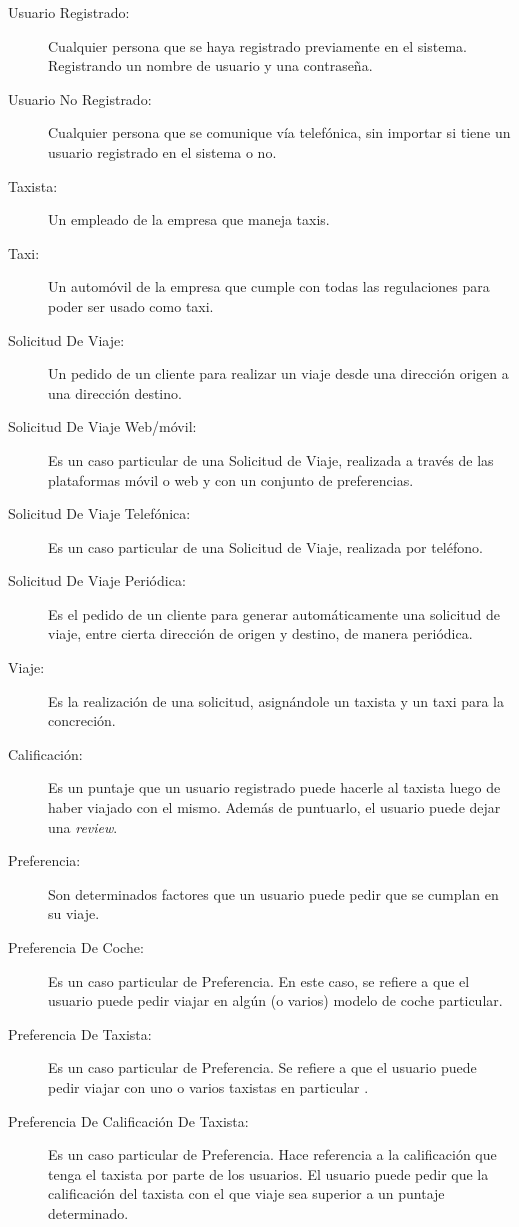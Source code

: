 \documentclass[a4paper, 10pt, twoside]{article}
\begin{document}
\begin{description}
  \item[Usuario Registrado:] Cualquier persona que se haya registrado previamente en el sistema. Registrando un nombre de usuario y una contraseña.

  \item[Usuario No Registrado:] Cualquier persona que se comunique vía telefónica, sin importar si tiene un usuario registrado en el sistema o no.

  \item[Taxista:] Un empleado de la empresa que maneja taxis.

  \item[Taxi:] Un automóvil de la empresa que cumple con todas las regulaciones para poder ser usado como taxi.

  \item[Solicitud De Viaje:] Un pedido de un cliente para realizar un viaje desde una dirección origen a una dirección destino.

  \item[Solicitud De Viaje Web/móvil:] Es un caso particular de una Solicitud de Viaje, realizada a través de las plataformas móvil o web y con un conjunto de preferencias.

  \item[Solicitud De Viaje Telefónica:] Es un caso particular de una Solicitud de Viaje, realizada por teléfono.

  \item[Solicitud De Viaje Periódica:] Es el pedido de un cliente para generar automáticamente una solicitud de viaje, entre cierta direcci\'on de origen y destino, de manera periódica. 
  
  \item[Viaje:] Es la realización de una solicitud, asignándole un taxista y un taxi para la concreción.
  
  \item[Calificación:] Es un puntaje que un usuario registrado puede hacerle al taxista luego de haber viajado con el mismo. Además de puntuarlo, el usuario puede dejar una \emph{review}.

  \item[Preferencia:] Son determinados factores que un usuario puede pedir que se cumplan en su viaje.

  \item[Preferencia De Coche:] Es un caso particular de Preferencia. En este caso, se refiere a que el usuario puede pedir viajar en algún (o varios) modelo de coche particular.

  \item[Preferencia De Taxista:] Es un caso particular de Preferencia. Se refiere a que el usuario puede pedir viajar con uno o varios taxistas en particular .

  \item[Preferencia De Calificación De Taxista:] Es un caso particular de Preferencia. Hace referencia a la calificación que tenga el taxista por parte de los usuarios. El usuario puede pedir que la calificación del taxista con el que viaje sea superior a un puntaje determinado.

\end{description}
\end{document}
